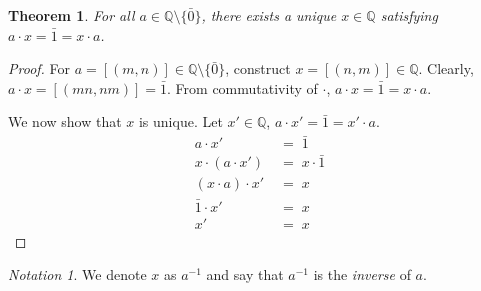 \documentclass[10pt]{article}
\newtheorem{theorem}{Theorem}[section]
\theoremstyle{definition}
\theoremstyle{remark}
\newtheorem*{notation}{Notation}
\newcommand{\Q}{\mathbb{Q}}
\begin{document}
        \begin{theorem}
                For all $a \in \Q\setminus\{\bar{0}\}$, there exists a unique $x \in \Q$ satisfying $a\cdot x = \bar{1} = x\cdot a$.
        \end{theorem}
        \begin{proof}
                For $a = [(m, n)] \in \Q\setminus\{\bar{0}\}$, construct $x = [(n, m)] \in \Q$.
                Clearly, $a\cdot x = [(mn, nm)] = \bar{1}$.
                From commutativity of $\cdot$, $a\cdot x = \bar{1} = x\cdot a$.

                We now show that $x$ is unique. Let $x' \in \Q$, $a\cdot x' = \bar{1} = x' \cdot a$.
                \begin{align*}
                        a\cdot x' \;&=\; \bar{1} \\
                        x\cdot (a\cdot x') \;&=\; x\cdot\bar{1}\\
                        (x\cdot a)\cdot x' \;&=\; x \\
                        \bar{1}\cdot x' \;&=\; x\\
                        x' \;&=\; x
                \end{align*}
        \end{proof}
        \begin{notation}
                We denote $x$ as $a^{-1}$ and say that $a^{-1}$ is the \emph{inverse} of $a$.
        \end{notation}
\end{document}
